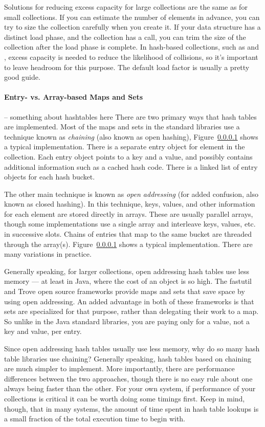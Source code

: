 Solutions for reducing excess capacity for large collections are the same as
for small collections. If you can estimate the number of elements in advance,
you can try to size the collection carefully when you create it.  If your data structure has a
distinct load phase, and the collection has a  call, you can
trim the size of the collection after the load phase is complete. In hash-based collections, such as
 and , excess capacity is needed to reduce the
likelihood of collisions, so it's important to leave headroom for this
purpose. The default load factor is usually a pretty good guide. 


\paragraph{Entry- vs. Array-based Maps and Sets}

-- something about hashtables here
There are two primary ways that hash tables are implemented. Most of the maps and sets
in the standard libraries use a technique known as \emph{chaining} (also
known as open hashing), Figure~\ref{} shows a typical
implementation. There is a separate entry object for element in the collection.
Each entry object points to a key and a value, and possibly contains
additional information such as a cached hash code. There is a linked list of
entry objects for each hash bucket.

The other main technique is known as \emph{open addressing} (for added
confusion, also known as closed hashing).  In this technique,
keys, values, and other information for each element are stored directly in
arrays. These are usually parallel arrays, though some implementations
use a single array and interleave keys, values, etc. in successive slots. Chains
of entries that map to the same bucket are threaded through the array(s).
Figure~\ref{} shows a typical implementation. There are many variations in
practice.

Generally speaking, for larger collections, open addressing hash tables use less
memory --- at least in Java, where the cost of an object is so high. The fastutil and Trove open source
frameworks provide maps and sets that save space by using open addressing. An added
advantage in both of these frameworks is that sets are specialized for
that purpose, rather than delegating their work to a map. So unlike in the Java standard libraries,
you are paying only for a value, not a key and value, per entry. 

Since open addressing hash tables usually use less memory, why do so many hash
table libraries use chaining? Generally speaking, hash tables based
on chaining are much simpler to implement. More importantly, there
are performance differences between the two approaches, though there is no easy
rule about one always being faster than the other. For your
own system, if performance of your collections is critical it can be worth doing
some timings first.  Keep in mind, though, that in many systems, the amount of time spent in
hash table lookups is a small fraction of the total execution time to begin with. 

